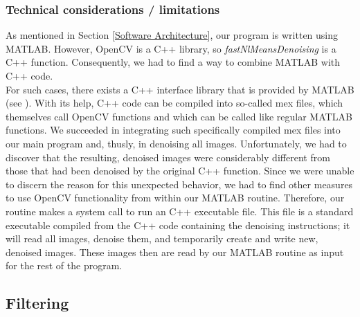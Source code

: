 \documentclass{article}
\begin{document}
\subsubsection{Technical considerations / limitations}
As mentioned in Section \ref{Software Architecture}, our program is written using MATLAB. However, OpenCV is a C++ library, so \textit{fastNlMeansDenoising} is a C++ function. Consequently, we had to find a way to combine MATLAB with C++ code. \\
For such cases, there exists a C++ interface library that is provided by MATLAB (see \cite{opencvInterfaceSupport}). With its help, C++ code can be compiled into so-called mex files, which themselves call OpenCV functions and which can be called like regular MATLAB functions. We succeeded in integrating such specifically compiled mex files into our main program and, thusly, in denoising all images. Unfortunately, we had to discover that the resulting, denoised images were considerably different from those that had been denoised by the original C++ function. Since we were unable to discern the reason for this unexpected behavior, we had to find other measures to use OpenCV functionality from within our MATLAB routine. Therefore, our routine makes a system call to run an C++ executable file. This file is a standard executable compiled from the C++ code containing the denoising instructions; it will read all images, denoise them, and temporarily create and write new, denoised images. These images then are read by our MATLAB routine as input for the rest of the program.

\newpage
\subsection{Filtering}\label{sec:Filtering}
\end{document}
